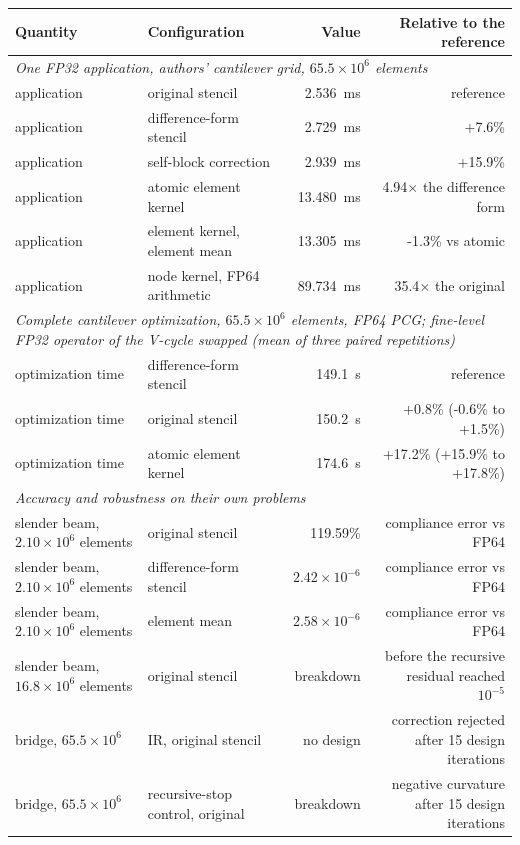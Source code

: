 \begin{tabular}{llrr}
\toprule
Quantity & Configuration & Value & Relative to the reference \\
\midrule
\multicolumn{4}{l}{\emph{One FP32 application, authors' cantilever grid, $65.5\times10^{6}$ elements}} \\
application & original stencil & 2.536~ms & reference \\
application & difference-form stencil & 2.729~ms & +7.6\% \\
application & self-block correction & 2.939~ms & +15.9\% \\
application & atomic element kernel & 13.480~ms & 4.94$\times$ the difference form \\
application & element kernel, element mean & 13.305~ms & -1.3\% vs atomic \\
application & node kernel, FP64 arithmetic & 89.734~ms & 35.4$\times$ the original \\
\midrule
\multicolumn{4}{l}{\emph{Complete cantilever optimization, $65.5\times10^{6}$ elements, FP64 PCG; fine-level FP32 operator of the V-cycle swapped (mean of three paired repetitions)}} \\
optimization time & difference-form stencil & 149.1~s & reference \\
optimization time & original stencil & 150.2~s & +0.8\% (-0.6\% to +1.5\%) \\
optimization time & atomic element kernel & 174.6~s & +17.2\% (+15.9\% to +17.8\%) \\
\midrule
\multicolumn{4}{l}{\emph{Accuracy and robustness on their own problems}} \\
slender beam, $2.10\times10^{6}$ elements & original stencil & 119.59\% & compliance error vs FP64 \\
slender beam, $2.10\times10^{6}$ elements & difference-form stencil & $2.42\times10^{-6}$ & compliance error vs FP64 \\
slender beam, $2.10\times10^{6}$ elements & element mean & $2.58\times10^{-6}$ & compliance error vs FP64 \\
slender beam, $16.8\times10^{6}$ elements & original stencil & breakdown & before the recursive residual reached $10^{-5}$ \\
bridge, $65.5\times10^{6}$ & IR, original stencil & no design & correction rejected after 15 design iterations \\
bridge, $65.5\times10^{6}$ & recursive-stop control, original & breakdown & negative curvature after 15 design iterations \\

\end{tabular}
